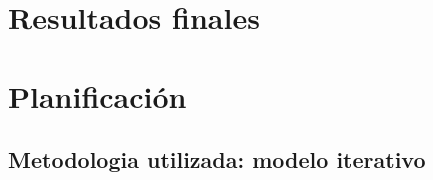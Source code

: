 




\section{Resultados finales}



\section{Planificación}



\subsection{Metodologia utilizada: modelo iterativo}

